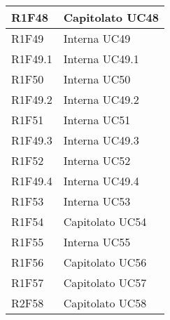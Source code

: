 \begin{center}
\begin{longtable}{|p{22mm}|p{44mm}|}
		R1F48 &
		Capitolato \newline
		UC48 
		\\
		\hline
		
		R1F49 &
		Interna \newline
		UC49 
		\\
		\hline
		
		R1F49.1 &
		Interna \newline
		UC49.1 
		\\
		\hline
		
		R1F50 &
		Interna \newline
		UC50 
		\\
		\hline
		
		R1F49.2 &
		Interna \newline
		UC49.2 
		\\
		\hline
		
		R1F51 &
		Interna \newline
		UC51 
		\\
		\hline
		
		R1F49.3 &
		Interna \newline
		UC49.3 
		\\
		\hline
		
		R1F52 &
		Interna \newline
		UC52 
		\\
		\hline
		
		R1F49.4 &
		Interna \newline
		UC49.4 
		\\
		\hline
		
		R1F53 &
		Interna \newline
		UC53 
		\\
		\hline
		
		R1F54 &
		Capitolato \newline
		UC54 
		\\
		\hline
		
		R1F55 &
		Interna \newline
		UC55 
		\\
		\hline
		
		R1F56 &
		Capitolato \newline
		UC56 
		\\
		\hline
		
		R1F57 &
		Capitolato \newline
		UC57 
		\\
		\hline
		
		R2F58 &
		Capitolato \newline
		UC58 
		\\
		\hline
		

\end{longtable}
\end{center}
